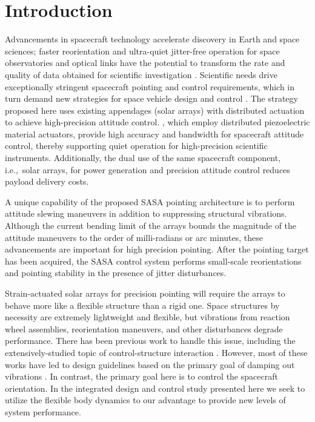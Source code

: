 \section{Introduction}

Advancements in spacecraft technology accelerate discovery in Earth and space sciences; faster reorientation and ultra-quiet jitter-free operation for space observatories and optical links have the potential to transform the rate and quality of data obtained for scientific investigation \cite{Arnon1998a, Ruiter2013a}. Scientific needs drive exceptionally stringent spacecraft pointing and control requirements, which in turn demand new strategies for space vehicle design and control \cite{Sirlin1987a, Rao1994a}.
The strategy proposed here uses existing appendages (solar arrays) with distributed actuation to achieve high-precision attitude control. , which employ distributed piezoelectric material actuators, provide high accuracy and bandwidth for spacecraft attitude control, thereby supporting quiet operation for high-precision scientific instruments. Additionally, the dual use of the same spacecraft component, i.e.,~solar arrays, for power generation and precision attitude control reduces payload delivery costs.

A unique capability of the proposed SASA pointing architecture is to perform attitude slewing maneuvers in addition to suppressing structural vibrations. 
Although the current bending limit of the arrays bounds the magnitude of the attitude maneuvers to the order of milli-radians or arc minutes, these advancements are important for high precision pointing.
After the pointing target has been acquired, the SASA control system performs small-scale reorientations and pointing stability in the presence of jitter disturbances.

Strain-actuated solar arrays for precision pointing will require the arrays to behave more like a flexible structure than a rigid one. Space structures by necessity are extremely lightweight and flexible, but vibrations from reaction wheel assemblies, reorientation maneuvers, and other disturbances degrade performance.
There has been previous work to handle this issue, including the extensively-studied topic of control-structure interaction \cite{Rao1994a, Meckl1994a}.
However, most of these works have led to design guidelines based on the primary goal of damping out vibrations \cite{Crawley1987a, Manning1991a}.
In contrast, the primary goal here is to control the spacecraft orientation. In the integrated design and control study presented here we seek to utilize the flexible body dynamics to our advantage to provide new levels of system performance.

